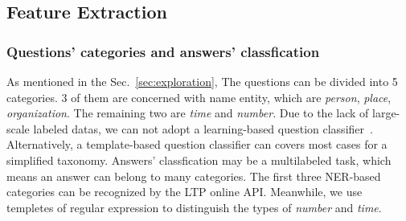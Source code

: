 \documentclass{llncs}
\begin{document}



\subsection{Feature Extraction}
\label{sec:feature}

\subsubsection{Questions' categories and answers' classfication}
\label{sec:categories}
As mentioned in the Sec.~\ref{sec:exploration}, 
The questions can be divided into 5 categories. 3 of them are concerned with name entity, which are \emph{person}, \emph{place}, \emph{organization}. The  remaining two are \emph{time} and \emph{number}. Due to the lack of large-scale labeled datas, we can not adopt a learning-based question classifier~\cite{Li2003Learning}. Alternatively, a template-based question classifier can covers most cases for a simplified taxonomy. 
Answers' classfication may be a multilabeled task, which means an answer can belong to many categories. The first three NER-based categories can be recognized by the LTP online API. Meanwhile, we use templetes  of regular expression to distinguish the types of \emph{number} and \emph{time}. 
\end{document}
